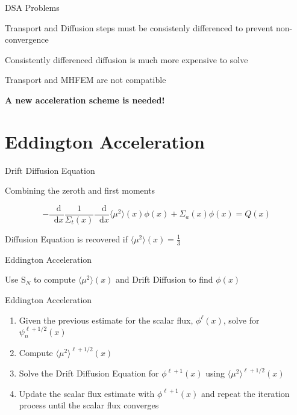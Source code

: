 \documentclass[10pt]{beamer}
\newcommand{\SN}{S$_N$\xspace}
\newcommand{\ud}{\mathop{}\!\mathrm{d}} %
\newcommand{\dderiv}[2]{\frac{\ud #1}{\ud #2}}
\newcommand{\edd}{\langle \mu^2 \rangle}
\begin{document}
\begin{frame}{DSA Problems}

    Transport and Diffusion steps must be consistenly differenced to prevent non-convergence 

    Consistently differenced diffusion is much more expensive to solve 

    Transport and MHFEM are not compatible

    \vfill 
    \centerline{\textbf{A new acceleration scheme is needed!}}

\end{frame}

\section{Eddington Acceleration}





\begin{frame}{Drift Diffusion Equation}

	Combining the zeroth and first moments 

	\begin{equation*}
		-\dderiv{}{x} \frac{1}{\Sigma_t(x)} \dderiv{}{x} \edd(x) \phi(x) + \Sigma_a(x) \phi(x) = Q(x) 
	\end{equation*}

	Diffusion Equation is recovered if $\edd(x) = \frac{1}{3}$
	
\end{frame}

\begin{frame}{Eddington Acceleration}

    Use \SN to compute $\edd(x)$ and Drift Diffusion to find $\phi(x)$ 

    \begin{exampleblock}{Eddington Acceleration}
    \begin{enumerate}
        \item Given the previous estimate for the scalar flux, $\phi^{\ell}(x)$, solve for $\psi_n^{\ell+1/2}(x)$

        \item \alert{Compute $\edd^{\ell+1/2}(x)$ }

        \item \alert{Solve the Drift Diffusion Equation for $\phi^{\ell+1}(x)$ using $\edd^{\ell+1/2}(x)$} 

        \item Update the scalar flux estimate with $\phi^{\ell+1}(x)$ and repeat the iteration process until the scalar flux converges
    \end{enumerate}
    \end{exampleblock}

\end{frame}
\end{document}
